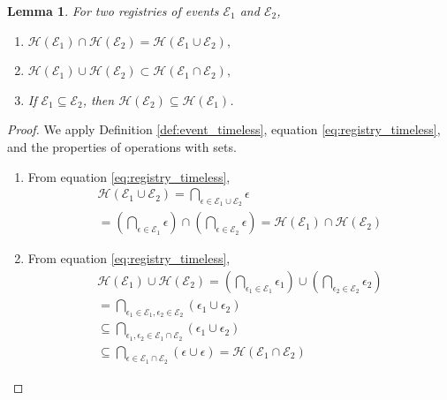 \documentclass[11pt]{amsart}
\theoremstyle{definition}
\theoremstyle{plain}
\newtheorem{lemma}[definition]{Lemma}
\begin{document}
\begin{lemma}
\label{thm:properties_events}
For two registries of events $\mathcal E_1$ and $\mathcal E_2$,
\begin{enumerate}
	\item 
$\mathscr{H}(\mathcal E_1)\cap \mathscr{H}(\mathcal E_2)=\mathscr{H}(\mathcal E_1\cup \mathcal E_2),$
	\item 
$\mathscr{H}(\mathcal E_1) \cup \mathscr{H}(\mathcal E_2)\subset\mathscr{H}(\mathcal E_1\cap \mathcal E_2),$
	\item 
If $\mathcal E_1\subseteq \mathcal E_2$, then $\mathscr{H}(\mathcal E_2)\subseteq \mathscr{H}(\mathcal E_1)$.
\end{enumerate}
\end{lemma}
\begin{proof}
We apply Definition \ref{def:event_timeless}, equation \eqref{eq:registry_timeless}, and the properties of operations with sets.
\begin{enumerate}
	\item From equation \eqref{eq:registry_timeless},
\begin{equation}
\begin{array}{l}
\mathscr{H}(\mathcal E_1\cup \mathcal E_2)=\bigcap_{\epsilon\in\mathcal E_1\cup \mathcal E_2}\epsilon \\
= \left(\bigcap_{\epsilon\in\mathcal E_1}\epsilon\right) \cap \left(\bigcap_{\epsilon\in\mathcal E_2}\epsilon\right)=\mathscr{H}(\mathcal E_1)\cap \mathscr{H}(\mathcal E_2)
\end{array}
\end{equation}
	\item From equation \eqref{eq:registry_timeless},
\begin{equation}
\begin{array}{l}
\mathscr{H}(\mathcal E_1) \cup \mathscr{H}(\mathcal E_2) = \left(\bigcap_{\epsilon_1\in\mathcal E_1}\epsilon_1\right) \cup \left(\bigcap_{\epsilon_2\in\mathcal E_2}\epsilon_2\right) \\
= \bigcap_{\epsilon_1\in\mathcal E_1, \epsilon_2\in\mathcal E_2}\left(\epsilon_1\cup \epsilon_2\right) \\
\subseteq \bigcap_{\epsilon_1, \epsilon_2\in\mathcal E_1\cap\mathcal E_2}\left(\epsilon_1\cup \epsilon_2\right) \\
\subseteq \bigcap_{\epsilon\in\mathcal E_1\cap\mathcal E_2}\left(\epsilon \cup \epsilon \right)= \mathscr{H}(\mathcal E_1\cap \mathcal E_2)
\end{array}
\end{equation}

\end{enumerate}
\end{proof}
\end{document}
